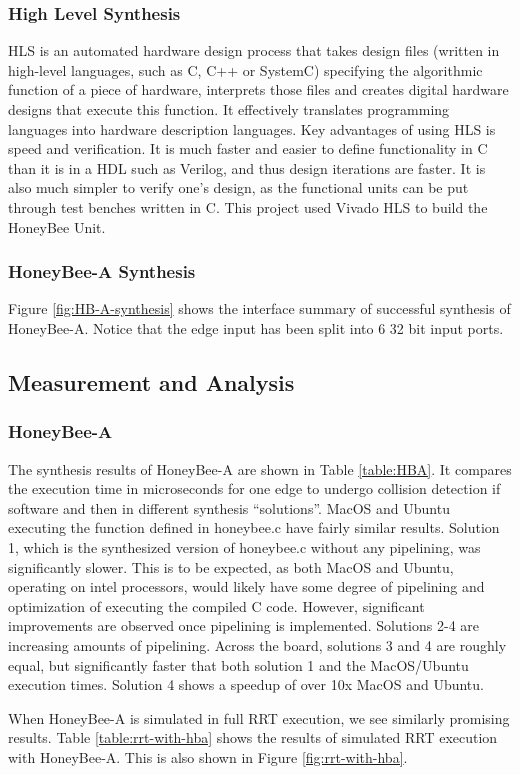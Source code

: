         \subsubsection*{High Level Synthesis}
        \gls{HLS} is an automated hardware design process that takes design files (written in high-level languages, such as C, C++ or SystemC) specifying the algorithmic function of a piece of hardware, interprets those files and creates digital hardware designs that execute this function. It effectively translates programming languages into hardware description languages. Key advantages of using HLS is speed and verification. It is much faster and easier to define functionality in C than it is in a \gls{HDL} such as Verilog, and thus design iterations are faster. It is also much simpler to verify one's design, as the functional units can be put through test benches written in C. This project used Vivado HLS to build the HoneyBee Unit.

        \subsubsection*{HoneyBee-A Synthesis}
        Figure \ref{fig:HB-A-synthesis} shows the interface summary of successful synthesis of HoneyBee-A. Notice that the edge input has been split into 6 32 bit input ports. 
        
    
    \subsection{Measurement and Analysis}
        \subsubsection*{HoneyBee-A}
            The synthesis results of HoneyBee-A are shown in Table \ref{table:HBA}. It compares the execution time in microseconds for one edge to undergo collision detection if software and then in different synthesis ``solutions''. MacOS and Ubuntu executing the function defined in honeybee.c have fairly similar results. Solution 1, which is the synthesized version of honeybee.c without any pipelining, was significantly slower. This is to be expected, as both MacOS and Ubuntu, operating on intel processors, would likely have some degree of pipelining and optimization of executing the compiled C code. However, significant improvements are observed once pipelining is implemented. Solutions 2-4 are increasing amounts of pipelining. Across the board, solutions 3 and 4 are roughly equal, but significantly faster that both solution 1 and the MacOS/Ubuntu execution times. Solution 4 shows a speedup of over 10x MacOS and Ubuntu.
            

            When HoneyBee-A is simulated in full \gls{RRT} execution, we see similarly promising results. Table \ref{table:rrt-with-hba} shows the results of simulated RRT execution with HoneyBee-A. This is also shown in Figure \ref{fig:rrt-with-hba}.
            
            

